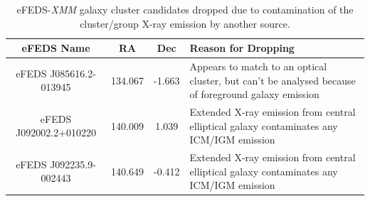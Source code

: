 \documentclass[fleqn,usenatbib]{mnras}
\begin{document}
\begin{table}
\begin{center}
\caption[]{{eFEDS-{\em XMM} galaxy cluster candidates dropped due to contamination of the cluster/group X-ray emission by another source.}\label{tab:contamrejects}}
\vspace{1mm}
\begin{tabular}{ccc|l}
\hline
\hline
eFEDS Name & RA & Dec & Reason for Dropping\\
\hline
\hline
eFEDS J085616.2-013945 & 134.067 & -1.663 & Appears to match to an optical cluster, but can't be analysed because of foreground galaxy emission \\
\hline
eFEDS J092002.2+010220 & 140.009 & 1.039 & Extended X-ray emission from central elliptical galaxy contaminates any ICM/IGM emission \\
\hline
eFEDS J092235.9-002443 & 140.649 & -0.412 & Extended X-ray emission from central elliptical galaxy contaminates any ICM/IGM emission\\
\hline
\end{tabular}
\end{center}
\end{table}
\end{document}
